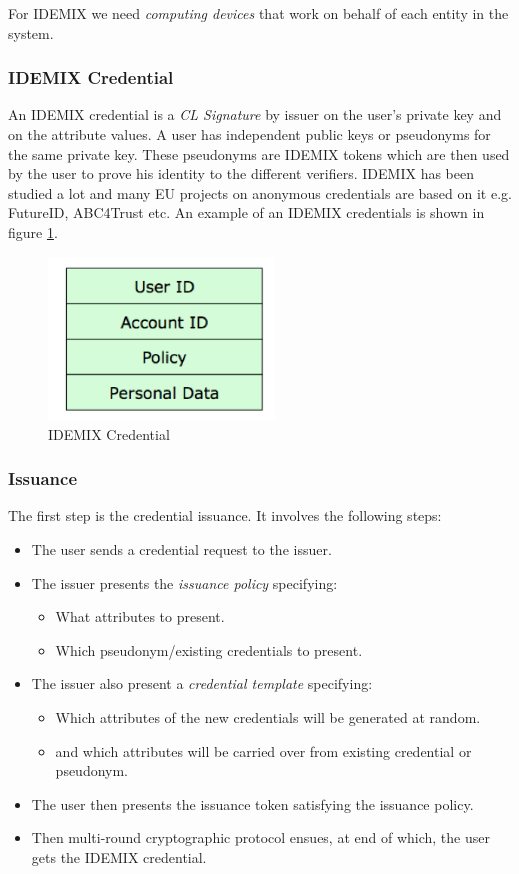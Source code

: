 For IDEMIX we need \textit{computing devices} that work on behalf of each entity in the system.
\subsubsection{IDEMIX Credential}
An IDEMIX credential is a \textit{CL Signature}\cite{camenisch2003signature} by issuer on the user's private key and on the attribute values. A user has independent public keys or pseudonyms for the same private key. These pseudonyms are IDEMIX tokens which are then used by the user to prove his identity to the different verifiers. IDEMIX has been studied a lot and many EU projects on anonymous credentials are based on it e.g. FutureID\cite{rossnagel2012futureid}, ABC4Trust\cite{sabouri2012attribute} etc. An example of an IDEMIX credentials is shown in figure \ref{fig:Credential}.
\begin{figure}[h]
	\centering
	\includegraphics[width=170pt]{figures/Credential}
	\caption{IDEMIX Credential}
	\label{fig:Credential}
\end{figure}
\subsubsection{Issuance}
The first step is the credential issuance. It involves the following steps:
\begin{itemize}
	\item The user sends a credential request to the issuer.
	\item The issuer presents the \textit{issuance policy} specifying:
	\begin{itemize}
		\item What attributes to present.
		\item Which pseudonym/existing credentials to present.
	\end{itemize}
	\item The issuer also present a \textit{credential template} specifying:
	\begin{itemize}
		\item Which attributes of the new credentials will be generated at random.
		\item and which attributes will be carried over from existing credential or pseudonym.
	\end{itemize}
	\item The user then presents the issuance token satisfying the issuance policy.
	\item Then multi-round cryptographic protocol ensues, at end of which, the user gets the IDEMIX credential.
\end{itemize}
